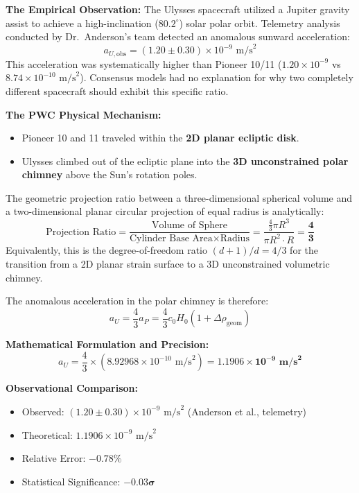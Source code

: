\documentclass[11pt,a4paper]{article}
\begin{document}
\textbf{The Empirical Observation:}  
The Ulysses spacecraft utilized a Jupiter gravity assist to achieve a high-inclination ($80.2^\circ$) solar polar orbit. Telemetry analysis conducted by Dr.~Anderson's team detected an anomalous sunward acceleration:
\begin{equation}
a_{U,\text{obs}} = (1.20 \pm 0.30) \times 10^{-9}\text{ m/s}^2
\end{equation}
This acceleration was systematically higher than Pioneer 10/11 ($1.20 \times 10^{-9}$ vs $8.74 \times 10^{-10}\text{ m/s}^2$). Consensus models had no explanation for why two completely different spacecraft should exhibit this specific ratio.

\textbf{The PWC Physical Mechanism:}  
\begin{itemize}
    \item Pioneer 10 and 11 traveled within the \textbf{2D planar ecliptic disk}.
    \item Ulysses climbed out of the ecliptic plane into the \textbf{3D unconstrained polar chimney} above the Sun's rotation poles.
\end{itemize}

The geometric projection ratio between a three-dimensional spherical volume and a two-dimensional planar circular projection of equal radius is analytically:
\begin{equation}
\text{Projection Ratio} = \frac{\text{Volume of Sphere}}{\text{Cylinder Base Area} \times \text{Radius}} = \frac{\frac{4}{3}\pi R^3}{\pi R^2 \cdot R} = \mathbf{\frac{4}{3}}
\end{equation}
Equivalently, this is the degree-of-freedom ratio $(d+1)/d = 4/3$ for the transition from a 2D planar strain surface to a 3D unconstrained volumetric chimney.

The anomalous acceleration in the polar chimney is therefore:
\begin{equation}
a_U = \frac{4}{3} a_P = \frac{4}{3} c_0 H_0 (1 + \Delta\rho_{\text{geom}})
\label{eq:a_u_pwc}
\end{equation}

\textbf{Mathematical Formulation and Precision:}  
\begin{equation}
a_U = \frac{4}{3} \times (8.92968 \times 10^{-10}\text{ m/s}^2) = \mathbf{1.1906 \times 10^{-9}\text{ m/s}^2}
\end{equation}

\textbf{Observational Comparison:}  
\begin{itemize}
    \item Observed: $(1.20 \pm 0.30) \times 10^{-9}\text{ m/s}^2$ (Anderson et al., telemetry)
    \item Theoretical: $1.1906 \times 10^{-9}\text{ m/s}^2$
    \item Relative Error: $-0.78\%$
    \item Statistical Significance: $\mathbf{-0.03\sigma}$
\end{itemize}
\end{document}
